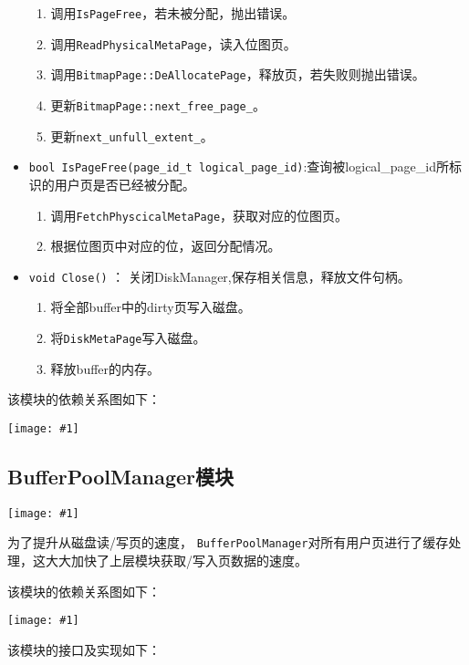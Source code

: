 \documentclass[12pt, a4paper]{article}
\def\c#1{\texttt{#1}}
\def\ss#1{\subsection{#1}}
\def\p{\par}
\def\g#1{\begin{center}\texttt{[image: \#1]}\end{center}}
\def\gm#1{\begin{center}\texttt{[image: \#1]}\end{center}}
\begin{document}
\begin{itemize}
\begin{enumerate}
   \item 调用\c{IsPageFree}，若未被分配，抛出错误。
   \item 调用\c{ReadPhysicalMetaPage}，读入位图页。
   \item 调用\c{BitmapPage::DeAllocatePage}，释放页，若失败则抛出错误。
   \item 更新\c{BitmapPage::next\_free\_page\_}。
   \item 更新\c{next\_unfull\_extent\_}。
 \end{enumerate}
 \item \c{bool IsPageFree(page\_id\_t logical\_page\_id)}:查询被logical\_page\_id所标识的用户页是否已经被分配。\begin{enumerate}
   \item 调用\c{FetchPhyscicalMetaPage}，获取对应的位图页。
   \item 根据位图页中对应的位，返回分配情况。
 \end{enumerate}
 \item \c{void Close()} ： 关闭DiskManager,保存相关信息，释放文件句柄。\begin{enumerate}
   \item 将全部buffer中的dirty页写入磁盘。
   \item 将\c{DiskMetaPage}写入磁盘。
   \item 释放buffer的内存。
 \end{enumerate}
\end{itemize}
\p 该模块的依赖关系图如下：
\g{./dots/DiskManager.pdf}
\ss{BufferPoolManager模块}
\gm{buffer_pool_manager.pdf}
为了提升从磁盘读/写页的速度， \c{BufferPoolManager}对所有用户页进行了缓存处理，这大大加快了上层模块获取/写入页数据的速度。
\p 该模块的依赖关系图如下：
\g{./dots/BufferPoolManager.pdf}
\p 该模块的接口及实现如下：
\end{document}
